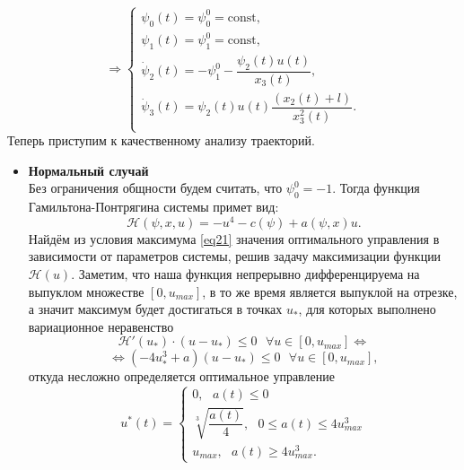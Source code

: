 \documentclass[a4paper,12pt]{article}
\begin{document}
$$ \Rightarrow \begin{cases}
	\psi_0(t) = \psi_0^0 = \mathrm{const}, \\
	\psi_1(t) = \psi_1^0 = \mathrm{const}, \\
	\dot{\psi}_2(t) = - \psi_1^0 - \dfrac{\psi_{2}(t)u(t)}{x_{3}(t)}, \\
	\dot{\psi}_3(t) = \psi_2(t)u(t) \dfrac{(x_2(t) + l)}{x_3^2(t)}. \\
\end{cases}$$
Теперь приступим к качественному анализу траекторий.
\begin{itemize}
\item \textbf{Нормальный случай} \\
Без ограничения общности будем считать, что $\psi_0^0 = -1$. Тогда функция Гамильтона-Понтрягина системы примет вид:
\[\mathcal{H}(\psi, x, u) = -u^4 - c(\psi) + a(\psi, x)u.\]
Найдём из условия максимума \eqref{eq21} значения оптимального управления в зависимости от параметров системы, решив задачу максимизации функции $\mathcal{H}(u)$. Заметим, что наша функция непрерывно дифференцируема на выпуклом множестве $[0, u_{max}]$, в то же время является выпуклой на отрезке, а значит максимум будет достигаться в точках $u_*$, для которых выполнено вариационное неравенство 
\[ \mathcal{H}'(u_*) \cdot (u - u_*) \leqslant 0 \ \ \ \forall u \in [0, u_{max}] \Leftrightarrow \]
\[ \Leftrightarrow (-4u^3_* + a)(u - u_*) \leqslant 0 \ \ \ \forall u \in [0, u_{max}], \]
откуда несложно определяется оптимальное управление
\hypertarget{p25}{}
\begin{equation} \label{eq25}
	u^*(t) = \begin{cases} 
		0, \ \ \ a(t) \leqslant 0 \\
		\sqrt[3]{\dfrac{a(t)}{4}}, \ \ \ 0 \leqslant a(t) \leqslant 4u_{max}^3  \\
		u_{max}, \ \ \ a(t) \geqslant 4u_{max}^3.
	\end{cases}
\end{equation}


\end{itemize}
\end{document}
